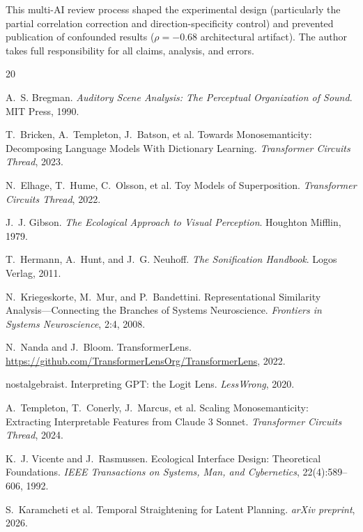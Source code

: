 \documentclass[11pt,a4paper]{article}
\begin{document}
This multi-AI review process shaped the experimental design (particularly the partial correlation correction and direction-specificity control) and prevented publication of confounded results ($\rho = -0.68$ architectural artifact). The author takes full responsibility for all claims, analysis, and errors.


\begin{thebibliography}{20}

A.~S. Bregman.
\newblock \emph{Auditory Scene Analysis: The Perceptual Organization of Sound}.
\newblock MIT Press, 1990.

T.~Bricken, A.~Templeton, J.~Batson, et al.
\newblock Towards Monosemanticity: Decomposing Language Models With Dictionary Learning.
\newblock \emph{Transformer Circuits Thread}, 2023.

N.~Elhage, T.~Hume, C.~Olsson, et al.
\newblock Toy Models of Superposition.
\newblock \emph{Transformer Circuits Thread}, 2022.

J.~J. Gibson.
\newblock \emph{The Ecological Approach to Visual Perception}.
\newblock Houghton Mifflin, 1979.

T.~Hermann, A.~Hunt, and J.~G. Neuhoff.
\newblock \emph{The Sonification Handbook}.
\newblock Logos Verlag, 2011.

N.~Kriegeskorte, M.~Mur, and P.~Bandettini.
\newblock Representational Similarity Analysis---Connecting the Branches of Systems Neuroscience.
\newblock \emph{Frontiers in Systems Neuroscience}, 2:4, 2008.

N.~Nanda and J.~Bloom.
\newblock TransformerLens.
\newblock \url{https://github.com/TransformerLensOrg/TransformerLens}, 2022.

nostalgebraist.
\newblock Interpreting GPT: the Logit Lens.
\newblock \emph{LessWrong}, 2020.

A.~Templeton, T.~Conerly, J.~Marcus, et al.
\newblock Scaling Monosemanticity: Extracting Interpretable Features from Claude 3 Sonnet.
\newblock \emph{Transformer Circuits Thread}, 2024.

K.~J. Vicente and J.~Rasmussen.
\newblock Ecological Interface Design: Theoretical Foundations.
\newblock \emph{IEEE Transactions on Systems, Man, and Cybernetics}, 22(4):589--606, 1992.

S.~Karamcheti et al.
\newblock Temporal Straightening for Latent Planning.
\newblock \emph{arXiv preprint}, 2026.

\end{thebibliography}
\end{document}
